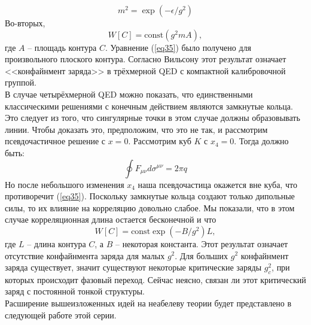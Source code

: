 \documentclass[12pt]{article}
\theoremstyle{definition}
\begin{document}
\begin{equation}
    m^2=\exp(-\epsilon/g^2)
\end{equation}
Во-вторых,
\begin{equation}\label{eq35}
    W[C]=\text{const}(g^2mA),
\end{equation}
где $A$ -- площадь контура $C$. Уравнение (\ref{eq35}) было получено для произвольного плоского контура. Согласно Вильсону этот результат означает <<конфайнмент заряда>> в трёхмерной QED с компактной калибровочной группой.\\
В случае четырёхмерной QED можно показать, что единственными классическими решениями с конечным действием являются замкнутые кольца. Это следует из того, что сингулярные точки в этом случае должны образовывать линии. Чтобы доказать это, предположим, что это не так, и рассмотрим псевдочастичное решение с $x = 0$. Рассмотрим куб $K$ с $x_4 = 0$. Тогда должно быть:
\begin{equation}\label{eq35}
    \oint F_{\mu\nu}d\sigma^{\mu\nu}=2\pi q
\end{equation}
Но после небольшого изменения $x_4$ наша псевдочастица окажется вне куба, что противоречит (\ref{eq35}).
Поскольку замкнутые кольца создают только дипольные силы, то их влияние на корреляцию довольно слабое. Мы показали, что в этом случае корреляционная длина остается бесконечной и что
\begin{equation}
    W[C]=\text{const}\exp(-B/g^2)L,
\end{equation}
где $L$ -- длина контура $C$, а $B$ -- некоторая константа. Этот результат означает отсутствие конфайнмента заряда для малых $g^2$. Для больших $g^2$ конфайнмент заряда существует, значит существуют некоторые критические заряды $g_c^2$, при которых происходит фазовый переход. Сейчас неясно, связан ли этот критический заряд с постоянной тонкой структуры.\\
Расширение вышеизложенных идей на неабелеву теории будет представлено в следующей работе этой серии.
\end{document}
